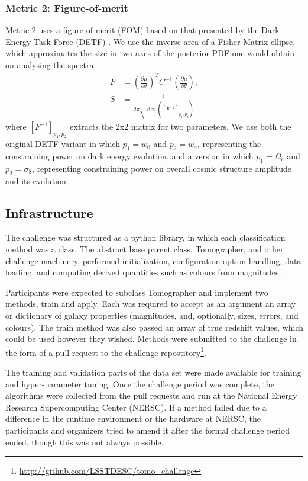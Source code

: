 \documentclass[twocolumn,twocolappendix]{aastex63}
\begin{document}
\subsubsection{Metric 2: Figure-of-merit}

Metric 2 uses a figure of merit (FOM) based on that presented by the Dark Energy Task Force (DETF) \citep{detf}.  We 
use the inverse area of a Fisher Matrix ellipse, which approximates the size in two axes 
of the posterior PDF one would obtain on analysing the spectra:
\begin{align}
    F &= \left( \frac{\partial \mu}{\partial \theta} \right)^T C^{-1} \left( \frac{\partial \mu}{\partial \theta} \right), \\
    S &= \frac{1}{2 \pi \sqrt{\det{([F^{-1}]_{p_1, p_2})}}}
\label{eq:fom}
\end{align}
where $[F^{-1}]_{p_1, p_2}$ extracts the 2x2 matrix for two parameters.  We use both the original
DETF variant in which $p_1 = w_0$ and $p_2 = w_a$, representing the constraining power on dark energy 
evolution, and a version in which $p_1 = \Omega_c$ and $p_2 = \sigma_8$, representing constraining
power on overall cosmic structure amplitude and its evolution.




\subsection{Infrastructure}

The challenge was structured as a python library, in which each classification
method was a class.  The abstract base parent class, {\sc Tomographer}, 
and other challenge machinery, performed initialization,
configuration option handling, data loading, and computing derived quantities
such as colours from magnitudes.

Participants were expected to subclass
{\sc Tomographer} and implement two methods, {\sc train} and {\sc apply}.  Each
was required to accept as an argument an array or dictionary of galaxy properties
(magnitudes, and, optionally, sizes, errors, and colours).  The {\sc train} method
was also passed an array of true redshift values, which could be used however they wished.
Methods were submitted to the challenge in the form of a pull request to the challenge
repostitory\footnote{\url{http://github.com/LSSTDESC/tomo_challenge}}.

The training and validation parts of the data set were made available for training
and hyper-parameter tuning. Once the challenge period was complete, the algorithms
were collected from the pull requests and run at the National Energy Research
Supercomputing Center (NERSC). If a method failed due to a difference in the
runtime environment or the hardware at NERSC, the participants and organizers tried
to amend it after the formal challenge period ended, though this was not always possible.
\end{document}
